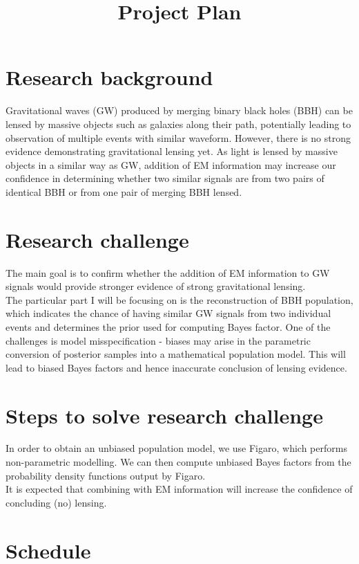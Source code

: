 \documentclass[pdflatex,sn-mathphys-ay]{sn-jnl}%
\begin{document}
\title[Article Title]{Project Plan}
\author*[]{ }

\maketitle

\section{Research background}
Gravitational waves (GW) produced by merging binary black holes (BBH) can be lensed by massive objects such as galaxies along their path, potentially leading to observation of multiple events with similar waveform. However, there is no strong evidence demonstrating gravitational lensing yet. As light is lensed by massive objects in a similar way as GW, addition of EM information may increase our confidence in determining whether two similar signals are from two pairs of identical BBH or from one pair of merging BBH lensed.

\section{Research challenge}
The main goal is to confirm whether the addition of EM information to GW signals would provide stronger evidence of strong gravitational lensing.\\
The particular part I will be focusing on is the reconstruction of BBH population, which indicates the chance of having similar GW signals from two individual events and determines the prior used for computing Bayes factor. One of the challenges is model misspecification - biases may arise in the parametric conversion of posterior samples into a mathematical population model. This will lead to biased Bayes factors and hence inaccurate conclusion of lensing evidence.

\section{Steps to solve research challenge}
In order to obtain an unbiased population model, we use Figaro, which performs non-parametric modelling. We can then compute unbiased Bayes factors from the probability density functions output by Figaro.\\ 
It is expected that combining with EM information will increase the confidence of concluding (no) lensing.

\section{Schedule}


\end{document}
